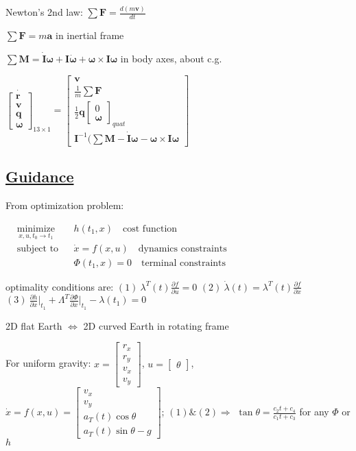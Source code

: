\documentclass[11pt,landscape]{article}
\begin{document}
Newton's 2nd law:
$\sum \bm F = \frac{d(m \bm v)}{dt}$

$\sum \bm F = m \bm a$ \quad in inertial frame

$\sum \bm M = 
\dot{\bm I} \bm\omega + \bm I \dot{\bm\omega} + \bm\omega \times \bm I \bm\omega$
\quad in body axes, about c.g.

$
\dot{
\begin{bmatrix} \bm r \\ \bm v \\ \bm q \\ \bm \omega \end{bmatrix}}_{13\times1}
=
\begin{bmatrix} \bm v \\ \frac{1}{m} \sum \bm F 
\\ \frac{1}{2} \bm q \begin{bmatrix} 0 \\ \bm\omega \end{bmatrix}_{quat}
\\ \bm I^{-1}(\sum \bm M - \dot{\bm I} \bm\omega - \bm\omega \times \bm I \bm\omega 
\end{bmatrix}
$

\newpage
\subsection{\underline{Guidance}}

From optimization problem:

$
\begin{aligned}
& \underset{x, u, t_0 \rightarrow t_1}{\text{minimize}}
& & h(t_1, x) \quad \text{cost function} \\
& \text{subject to}
& & \dot{x} = f(x, u) \quad \text{dynamics constraints} \\
&&& \Phi(t_1, x) = 0 \quad \text{terminal constraints}
\end{aligned}
$

optimality conditions are:
$(1)\ \lambda^T(t) \frac{\partial f}{\partial u} = 0$ \quad
$(2)\ \dot{\lambda}(t) = \lambda^T(t) \frac{\partial f}{\partial x}$ \quad
$(3)\ \frac{\partial h}{\partial x}\Big|_{t_1} + 
\Lambda^T \frac{\partial \Phi}{\partial x}\Big|_{t_1} - 
\lambda(t_1) = 0$

2D flat Earth $\Leftrightarrow$ 2D curved Earth in rotating frame

For uniform gravity:
$x = \begin{bmatrix} r_x \\ r_y \\ v_x \\ v_y \end{bmatrix}$,
$u = \begin{bmatrix} \theta \end{bmatrix}$,
$\dot{x} = f(x, u) = 
\begin{bmatrix} v_x \\ v_y \\ a_T(t)\cos\theta \\ a_T(t)\sin\theta - g
\end{bmatrix}$;
$(1) \& (2) \Rightarrow$
$\tan\theta = \frac{c_2 t + c_4}{c_1 t + c_3}$
for any $\Phi$ or $h$
\end{document}

